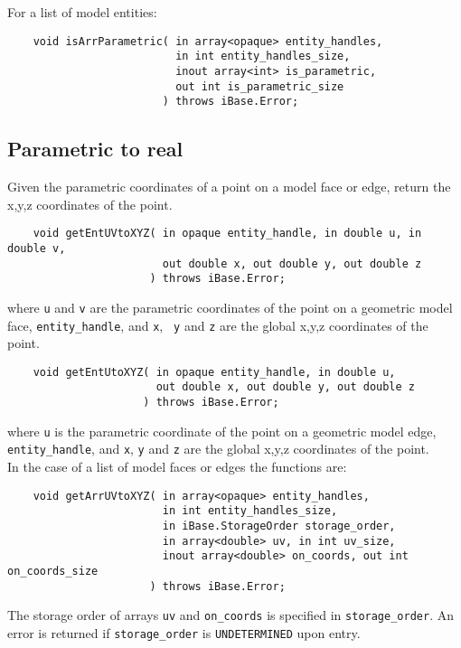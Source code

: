 \documentclass{article}
\begin{document}
\hspace{-16pt}For a list of model entities:

\begin{verbatim}
    void isArrParametric( in array<opaque> entity_handles, 
                          in int entity_handles_size, 
                          inout array<int> is_parametric, 
                          out int is_parametric_size
                        ) throws iBase.Error;
\end{verbatim}

\subsection{Parametric to real}
Given the parametric coordinates of a point on a model face 
or edge, return the x,y,z coordinates of the point.

\begin{verbatim}
    void getEntUVtoXYZ( in opaque entity_handle, in double u, in double v,
                        out double x, out double y, out double z
                      ) throws iBase.Error;
\end{verbatim}
where {\tt u} and {\tt v} are the parametric coordinates of the 
point on a geometric model face, {\tt entity\_handle}, and {\tt x}, {\tt
  y} and {\tt z} are 
the global x,y,z coordinates of the point.

\begin{verbatim}
    void getEntUtoXYZ( in opaque entity_handle, in double u,
                       out double x, out double y, out double z
                     ) throws iBase.Error;
\end{verbatim}
where {\tt u} is the parametric coordinate of the point 
on a geometric model edge, {\tt entity\_handle}, and {\tt x}, {\tt y}
and {\tt z} are 
the global x,y,z coordinates of the point.\\

\hspace{-16pt}In the case of a list of model faces or edges the functions 
are:

\begin{verbatim}
    void getArrUVtoXYZ( in array<opaque> entity_handles, 
                        in int entity_handles_size,
                        in iBase.StorageOrder storage_order,
                        in array<double> uv, in int uv_size,
                        inout array<double> on_coords, out int on_coords_size
                      ) throws iBase.Error;
\end{verbatim}
The storage order of arrays {\tt uv} and {\tt on\_coords} is specified in
{\tt storage\_order}. An error is returned if {\tt storage\_order}
 is {\tt UNDETERMINED} upon entry.
\end{document}
